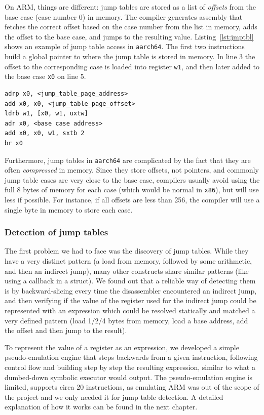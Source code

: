 \documentclass[a4paper,11pt,oneside]{report}
\begin{document}
On ARM, things are different: jump tables are stored as a list of 
\emph{offsets} from the base case (case number 0) in memory. The compiler 
generates assembly that fetches the correct offset based on the case number 
from the list in memory, adds the offset to the base case, and jumps to the 
resulting value. Listing~\ref{lst:jmptbl} shows an example of jump table access 
in \texttt{aarch64}. The first two instructions build a global pointer to where 
the jump table is stored in memory. In line 3 the offset to the corresponding 
case is loaded into register \texttt{w1}, and then later added to the base case 
\texttt{x0} on line 5. 


\begin{lstlisting}[label={lst:jmptbl},caption={Example of a jump table in \texttt{aarch64}}]
adrp x0, <jump_table_page_address>
add x0, x0, <jump_table_page_offset>
ldrb w1, [x0, w1, uxtw]
adr x0, <base case address>
add x0, x0, w1, sxtb 2
br x0
\end{lstlisting}

Furthermore, jump tables in \texttt{aarch64} are complicated by the fact that 
they are often \emph{compressed} in memory. Since they store offsets, not 
pointers, and commonly jump table cases are very close to the base case, 
compilers usually avoid using the full 8 bytes of memory for each case (which 
would be normal in \texttt{x86}), but will use less if possible. For instance, 
if all offsets are less than 256, the compiler will use a single byte in memory 
to store each case.  

\subsubsection{Detection of jump tables}
The first problem we had to face was the discovery of jump tables. While they 
have a very distinct pattern (a load from memory, followed by some arithmetic, 
and then an indirect jump), many other constructs share similar patterns (like 
using a callback in a struct). We found out that a reliable way of detecting 
them is by backward-slicing every time the disassembler encountered an indirect 
jump, and then verifying if the value of the register used for the indirect 
jump could be represented with an expression which could be resolved statically 
and matched a very defined pattern (load 1/2/4 bytes from memory, load a base 
address, add the offset and then jump to the result). 

To represent the value of a register as an expression, we developed a simple
pseudo-emulation engine that steps backwards from a given instruction, 
following control flow and building step by step the resulting expression, 
similar to what a dumbed-down symbolic executor would output. The 
pseudo-emulation engine is limited, supports circa 20 instructions, as 
emulating ARM was out of the scope of the project and we only needed it for 
jump table detection. A detailed explanation of how it works can be found in 
the next chapter.
\end{document}
